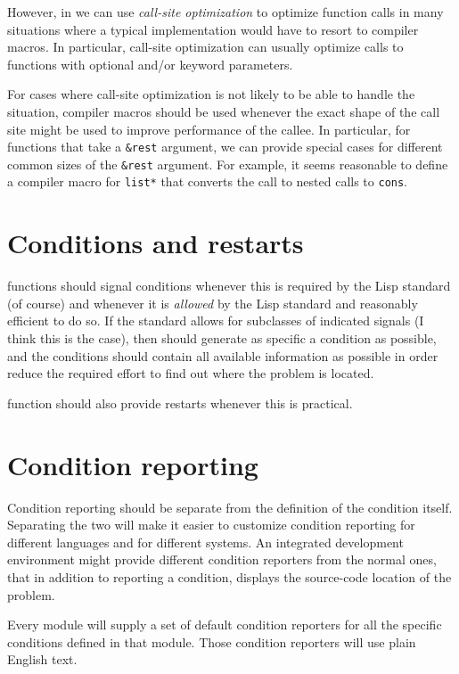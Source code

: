 However, in \sysname{} we can use \emph{call-site optimization} to
optimize function calls in many situations where a typical
\commonlisp{} implementation would have to resort to compiler macros.
In particular, call-site optimization can usually optimize calls to
functions with optional and/or keyword parameters.

For cases where call-site optimization is not likely to be able to
handle the situation, compiler macros should be used whenever the
exact shape of the call site might be used to improve performance of
the callee. In particular, for functions that take a \texttt{\&rest}
argument, we can provide special cases for different common sizes of
the \texttt{\&rest} argument.  For example, it seems reasonable to
define a compiler macro for \texttt{list*} that converts the call to
nested calls to \texttt{cons}.

\section{Conditions and restarts}

\sysname{} functions should signal conditions whenever this is
required by the Lisp standard (of course) and whenever it is
\emph{allowed} by the Lisp standard and reasonably efficient to do so.
If the standard allows for subclasses of indicated signals (I think
this is the case), then \sysname{} should generate as specific a
condition as possible, and the conditions should contain all available
information as possible in order reduce the required effort to
find out where the problem is located.

\sysname{} function should also provide restarts whenever this is
practical.

\section{Condition reporting}

Condition reporting should be separate from the definition of the
condition itself.  Separating the two will make it easier to customize
condition reporting for different languages and for different
systems.  An integrated development environment might provide
different condition reporters from the normal ones, that in addition
to reporting a condition, displays the source-code location of the
problem.

Every \sysname{} module will supply a set of default condition
reporters for all the specific conditions defined in that module.
Those condition reporters will use plain English text.

